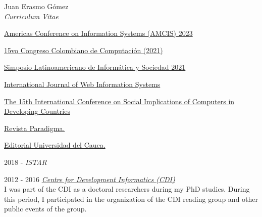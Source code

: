 \documentclass[10pt]{article}
\newenvironment{subbulletlist}{%
  \begin{list}{\labelitemii}{%
      \setlength{\topsep}{\itemsep}\setlength{\parskip}{\parsep}%
    }%
  }%
  { \end{list} }
\begin{document}
\begin{cv}{Juan Erasmo Gómez\\{\large \itshape Curriculum Vitae}}
  \begin{cvlist}{}
  \item \textbf{}
    \begin{subbulletlist}
    \item \href{https://amcis2023.aisconferences.org/}{Americas Conference on Information Systems (AMCIS) 2023}
    \item \href{http://15ccc.sco2.org/index_eng.html}{15vo Congreso Colombiano de Computación (2021)}
    \item \href{https://clei2021.cr/simplatisd}{Simposio Latinoamericano de Informática y Sociedad 2021}
    \item \href{https://www.emeraldgrouppublishing.com/journal/ijwis}{International Journal of Web Information Systems}
    \item \href{https://2019ifipwg94.net/}{The 15th International Conference on Social Implications of Computers in Developing Countries}
    \item \href{http://paradigma.uniandes.edu.co/}{Revista Paradigma.}
    \item \href{http://www.unicauca.edu.co/editorial/}{Editorial Universidad del Cauca.}
    \end{subbulletlist}
  \item \textbf{}

  \item[2018 - ] \textit{ ISTAR }\\
    
  \item[2012 - 2016] \textit{\href{http://www.cdi.manchester.ac.uk/}{Centre for Development Informatics (CDI)}}\\
    {I was part of the CDI as a doctoral researchers during my PhD studies. During this period, I participated in the organization of the CDI reading group and other public events of the group.}


\end{cvlist}
\end{cv}
\end{document}
